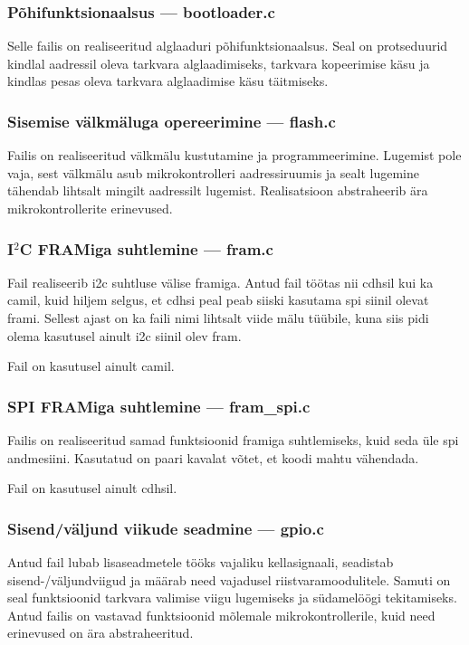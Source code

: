 \documentclass[12pt,a4paper]{article}
\newcommand{\iic}{I${}^2$C}
\begin{document}
\subsubsection{Põhifunktsionaalsus --- \textbf{bootloader.c}}
Selle failis on realiseeritud alglaaduri põhifunktsionaalsus. Seal on
protseduurid kindlal aadressil oleva tarkvara alglaadimiseks, tarkvara
kopeerimise käsu ja kindlas pesas oleva tarkvara alglaadimise käsu täitmiseks.

\subsubsection{Sisemise välkmäluga opereerimine --- \textbf{flash.c}}
Failis on realiseeritud välkmälu kustutamine ja programmeerimine.
Lugemist pole vaja, sest välkmälu asub mikrokontrolleri aadressiruumis ja sealt
lugemine tähendab lihtsalt mingilt aadressilt lugemist. Realisatsioon
abstraheerib ära mikrokontrollerite erinevused.

\subsubsection{\texorpdfstring{\iic}{I2C} FRAMiga suhtlemine --- \textbf{fram.c}}
Fail realiseerib \gls{i2c} suhtluse välise \gls{fram}iga. Antud fail töötas nii
\gls{cdhs}il kui ka \gls{cam}il, kuid hiljem selgus, et \gls{cdhs}i peal peab
siiski kasutama \gls{spi} siinil olevat \gls{fram}i. Sellest ajast on ka faili
nimi lihtsalt viide mälu tüübile, kuna siis pidi olema kasutusel ainult
\gls{i2c} siinil olev \gls{fram}.

Fail on kasutusel ainult \gls{cam}il.

\subsubsection{SPI FRAMiga suhtlemine --- \textbf{fram\_spi.c}}
Failis on realiseeritud samad funktsioonid \gls{fram}iga suhtlemiseks, kuid seda
üle \gls{spi} andmesiini. Kasutatud on paari kavalat võtet, et koodi mahtu
vähendada.

Fail on kasutusel ainult \gls{cdhs}il.

\subsubsection{Sisend/väljund viikude seadmine --- \textbf{gpio.c}}
Antud fail lubab lisaseadmetele tööks vajaliku kellasignaali, seadistab
sisend-/väljundviigud ja määrab need vajadusel riistvaramoodulitele. Samuti on
seal funktsioonid tarkvara valimise viigu lugemiseks ja südamelöögi
tekitamiseks. Antud failis on vastavad funktsioonid mõlemale mikrokontrollerile,
kuid need erinevused on ära abstraheeritud.
\end{document}
